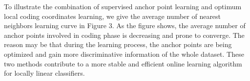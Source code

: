 \documentclass{llncs}
\begin{document}

	To illustrate the combination of supervised anchor point learning and optimum local coding coordinates learning, we give the average number of nearest neighbors learning curve in Figure 3. As the figure shows, the average number of anchor points involved in coding phase is decreasing and prone to converge. The reason may be that during the learning process, the anchor points are being optimized and gain more discriminative information of the whole dataset. These two methods contribute to a more stable and efficient online learning algorithm for locally linear classifiers.
\end{document}
